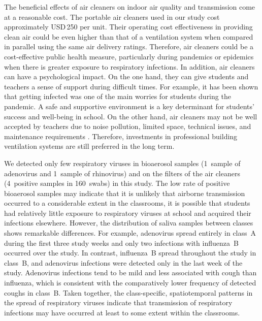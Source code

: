 \documentclass[fleqn,11pt]{wlscirep}
\begin{document}

The beneficial effects of air cleaners on indoor air quality and transmission come at a reasonable cost. The portable air cleaners used in our study cost approximately USD\,250 per unit. Their operating cost effectiveness in providing clean air could be even higher than that of a ventilation system when compared in parallel using the same air delivery ratings\cite{Noh2016EnBuild}. Therefore, air cleaners could be a cost-effective public health measure, particularly during pandemics or epidemics when there is greater exposure to respiratory infections. In addition, air cleaners can have a psychological impact. On the one hand, they can give students and teachers a sense of support during difficult times. For example, it has been shown that getting infected was one of the main worries for students during the pandemic\cite{Yuerekli2022IJERPH}. A safe and supportive environment is a key determinant for students' success and well-being in school\cite{Kutsyuruba2015RevEduc}. On the other hand, air cleaners may not be well accepted by teachers due to noise pollution, limited space, technical issues, and maintenance requirements \cite{Sanguinetti2022IndoorAir}. Therefore, investments in professional building ventilation systems are still preferred in the long term\cite{Nardell2016}.


We detected only few respiratory viruses in bioaerosol samples (1~sample of adenovirus and 1~sample of rhinovirus) and on the filters of the air cleaners (4~positive samples in 160~swabs) in this study. The low rate of positive bioaerosol samples may indicate that it is unlikely that airborne transmission occurred to a considerable extent in the classrooms, \ie it is possible that students had relatively little exposure to respiratory viruses at school and acquired their infections elsewhere. However, the distribution of saliva samples between classes shows remarkable differences. For example, adenovirus spread entirely in class~A during the first three study weeks and only two infections with influenza~B occurred over the study. In contrast, influenza~B spread throughout the study in class~B, and adenovirus infections were detected only in the last week of the study. Adenovirus infections tend to be mild\cite{Kunz2010CIDR} and less associated with cough than influenza\cite{Ma2018RMV}, which is consistent with the comparatively lower frequency of detected coughs in class~B. Taken together, the class-specific, spatiotemporal patterns in the spread of respiratory viruses indicate that transmission of respiratory infections may have occurred at least to some extent within the classrooms. 
\end{document}
